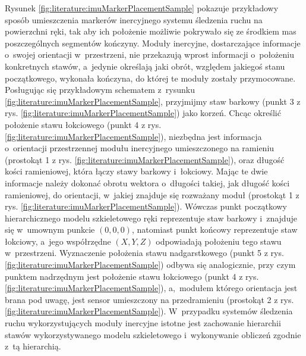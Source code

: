 Rysunek \ref{fig:literature:imuMarkerPlacementSample} pokazuje przykładowy sposób umieszczenia markerów inercyjnego systemu śledzenia ruchu na powierzchni ręki, tak aby ich położenie możliwie pokrywało się ze środkiem mas poszczególnych segmentów kończyny. Moduły inercyjne, dostarczające informacje o~swojej orientacji w~przestrzeni, nie przekazują wprost informacji o~położeniu konkretnych stawów, a~jedynie określają jaki obrót, względem jakiegoś stanu początkowego, wykonała kończyna, do której te moduły zostały przymocowane. Posługując się przykładowym schematem z~rysunku \ref{fig:literature:imuMarkerPlacementSample}, przyjmijmy staw barkowy (punkt 3 z rys. \ref{fig:literature:imuMarkerPlacementSample}) jako korzeń. Chcąc określić położenie stawu łokciowego (punkt 4 z rys. \ref{fig:literature:imuMarkerPlacementSample}), niezbędna jest informacja o~orientacji przestrzennej modułu inercyjnego umieszczonego na ramieniu (prostokąt 1 z rys. \ref{fig:literature:imuMarkerPlacementSample}), oraz długość kości ramieniowej, która łączy stawy barkowy i~łokciowy. Mając te dwie informacje należy dokonać obrotu wektora o~długości takiej, jak długość kości ramieniowej, do orientacji, w~jakiej znajduje się rozważany moduł (prostokąt 1 z rys. \ref{fig:literature:imuMarkerPlacementSample}). Wówczas punkt początkowy hierarchicznego modelu szkieletowego ręki reprezentuje staw barkowy i~znajduje się w~umownym punkcie $(0 , 0 , 0)$, natomiast punkt końcowy reprezentuje staw łokciowy, a~jego współrzędne $(X , Y , Z)$ odpowiadają położeniu tego stawu w~przestrzeni. Wyznaczenie położenia stawu nadgarstkowego (punkt 5 z rys. \ref{fig:literature:imuMarkerPlacementSample}) odbywa się analogicznie, przy czym punktem nadrzędnym jest położenie stawu łokciowego (punkt 4 z rys. \ref{fig:literature:imuMarkerPlacementSample}), a,~modułem którego orientacja jest brana pod uwagę, jest sensor umieszczony na przedramieniu (prostokąt 2 z rys. \ref{fig:literature:imuMarkerPlacementSample}). W~przypadku systemów śledzenia ruchu wykorzystujących moduły inercyjne istotne jest zachowanie hierarchii stawów wykorzystywanego modelu szkieletowego i~wykonywanie obliczeń zgodnie z~tą hierarchią.
																							
